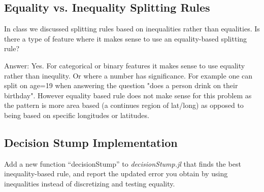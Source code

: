 \documentclass{article}
\def\ans#1{\par\gre{Answer: #1}}
\def\blu#1{{\color{blu}#1}}
\def\gre#1{{\color{gre}#1}}
\begin{document}
\subsection{Equality vs. Inequality Splitting Rules}

In class we discussed splitting rules based on inequalities rather than equalities. \blu{Is there a type of feature where it makes sense to use 
an equality-based splitting rule?}

\ans{
	Yes. For categorical or binary features it makes sense to use equality rather than inequlity. Or where a number has significance. For example one can split on age=19 when answering the question "does a person drink on their birthday". However equality based rule does not make sense for this problem as the pattern is more area based (a continues region of lat/long) as opposed to being based on specific longitudes or latitudes.
}

\subsection{Decision Stump Implementation}

\blu{Add a new function ``decisionStump'' to \emph{decisionStump.jl} that finds the best inequality-based rule, and report the updated error you obtain by using inequalities instead of discretizing and testing equality.}
\end{document}
